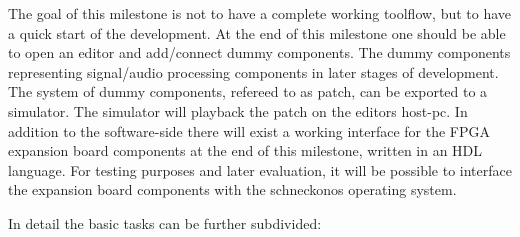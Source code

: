 The goal of this milestone is not to have a complete working toolflow, but to have a quick start of the development. At the end of this milestone one should be able to open an editor and add/connect dummy components. The dummy components representing signal/audio processing components in later stages of development. The system of dummy components, refereed to as patch, can be exported to a simulator. The simulator will playback the patch on the editors host-pc. 
In addition to the software-side there will exist a working interface for the FPGA expansion board components at the end of this milestone, written in an HDL language. For testing purposes and later evaluation, it will be possible to interface the expansion board components with the schneckonos operating system. 

In detail the basic tasks can be further subdivided:

